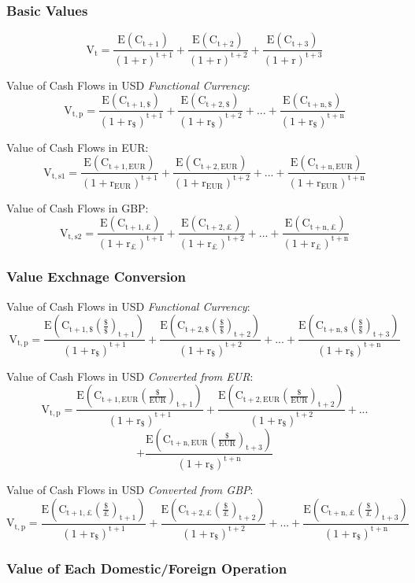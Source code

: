 \documentclass[11pt, english]{article}
\begin{document}
		\subsubsection{Basic Values}
	
	$$\mathrm{V_t=\frac{E(C_{t+1})}{(1+r)^{t+1}}+\frac{E(C_{t+2})}{(1+r)^{t+2}}+\frac{E(C_{t+3})}{(1+r)^{t+3}}}$$

	Value of Cash Flows in USD \textit{Functional Currency}:
	$$\mathrm{V_{t,p}=\frac{E(C_{t+1,\$})}{(1+r_\$)^{t+1}}+\frac{E(C_{t+2,\$})}{(1+r_\$)^{t+2}}+...+\frac{E(C_{t+n,{\$}})}{(1+r_\$)^{t+n}}}$$

	Value of Cash Flows in EUR:
	$$\mathrm{V_{t,s1}=\frac{E(C_{t+1,EUR})}{(1+r_{EUR})^{t+1}}+\frac{E(C_{t+2,{EUR}})}{(1+r_{EUR})^{t+2}}+...+\frac{E(C_{t+n,{EUR}})}{(1+r_{EUR})^{t+n}}}$$

	Value of Cash Flows in GBP:
	$$\mathrm{V_{t,s2}=\frac{E(C_{t+1,\pounds})}{(1+r_\pounds)^{t+1}}+\frac{E(C_{t+2,\pounds})}{(1+r_\pounds)^{t+2}}+...+\frac{E(C_{t+n,{\pounds}})}{(1+r_\pounds)^{t+n}}}$$

		\subsubsection{Value Exchnage Conversion}

	Value of Cash Flows in USD \textit{Functional Currency}:
	$$\mathrm{V_{t,p}=\frac{E\left(C_{t+1,\$}\left(\frac{\$}{\$}\right)_{t+1}\right)}{(1+r_\$)^{t+1}}+\frac{E\left(C_{t+2,\$}\left(\frac{\$}{\$}\right)_{t+2}\right)}{(1+r_\$)^{t+2}}+...+\frac{E\left(C_{t+n,{\$}}\left(\frac{\$}{\$}\right)_{t+3}\right)}{(1+r_\$)^{t+n}}}$$

	Value of Cash Flows in USD \textit{Converted from EUR}:
	$$\mathrm{V_{t,p}=\frac{E\left(C_{t+1,EUR}\left(\frac{\$}{EUR}\right)_{t+1}\right)}{(1+r_\$)^{t+1}}+\frac{E\left(C_{t+2,EUR}\left(\frac{\$}{EUR}\right)_{t+2}\right)}{(1+r_\$)^{t+2}}+...}$$ $$\mathrm{+\frac{E\left(C_{t+n,{EUR}}\left(\frac{\$}{EUR}\right)_{t+3}\right)}{(1+r_\$)^{t+n}}}$$

	Value of Cash Flows in USD \textit{Converted from GBP}:
	$$\mathrm{V_{t,p}=\frac{E\left(C_{t+1,\pounds}\left(\frac{\$}{\pounds}\right)_{t+1}\right)}{(1+r_\$)^{t+1}}+\frac{E\left(C_{t+2,\pounds}\left(\frac{\$}{\pounds}\right)_{t+2}\right)}{(1+r_\$)^{t+2}}+...+\frac{E\left(C_{t+n,{\pounds}}\left(\frac{\$}{\pounds}\right)_{t+3}\right)}{(1+r_\$)^{t+n}}}$$

		\subsubsection{Value of Each Domestic/Foreign Operation}
\end{document}
